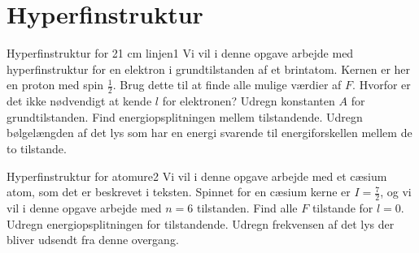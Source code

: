 \section*{Hyperfinstruktur}
\begin{opgave}{Hyperfinstruktur for 21 cm linjen}{1}
Vi vil i denne opgave arbejde med hyperfinstruktur for en elektron i grundtilstanden af et brintatom.
\opg Kernen er her en proton med spin $\frac{1}{2}$. Brug dette til at finde alle mulige værdier af $F$. Hvorfor er det ikke nødvendigt at kende $l$ for elektronen?
\opg Udregn konstanten $A$ for grundtilstanden.
\opg Find energiopsplitningen mellem tilstandende.
\opg Udregn bølgelængden af det lys som har en energi svarende til energiforskellen mellem de to tilstande.
\end{opgave}
\begin{opgave}{Hyperfinstruktur for atomure}{2}
Vi vil i denne opgave arbejde med et cæsium atom, som det er beskrevet i teksten.
Spinnet for en cæsium kerne er $I=\frac{7}{2}$, og vi vil i denne opgave arbejde med $n=6$ tilstanden.
\opg Find alle $F$ tilstande for $l=0$.
\opg Udregn energiopsplitningen for tilstandende.
\opg Udregn frekvensen af det lys der bliver udsendt fra denne overgang.
\end{opgave}
